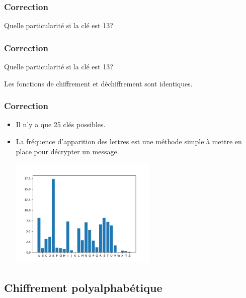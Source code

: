 \documentclass[svgnames,11pt]{beamer}
\begin{document}
\begin{frame}
    \frametitle{Correction}

    Quelle particularité si la clé est 13?
\end{frame}
\begin{frame}
    \frametitle{Correction}

    Quelle particularité si la clé est 13?
    
    Les fonctions de chiffrement et déchiffrement sont identiques.
\end{frame}
\begin{frame}
    \frametitle{Correction}

    \begin{itemize}
        \item<1->Il n'y a que 25 clés possibles.
        \item<2->La fréquence d'apparition des lettres est une méthode simple à mettre en place pour décrypter un message.
        \begin{center}
        \centering
        \includegraphics[width=7cm]{ressources/frequence-apparition.png}
        \label{IMG}
        \end{center}
    \end{itemize}

\end{frame}
\subsection{Chiffrement polyalphabétique}
\end{document}
